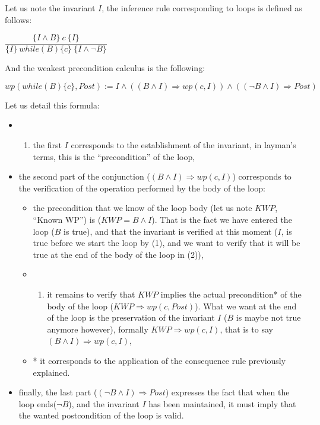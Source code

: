 
Let us note the invariant $I$, the inference rule corresponding to
loops is defined as follows:

\begin{center}
$\dfrac{\{I \wedge B \}\ c\ \{I\}}{\{I\}\ while(B)\{c\}\ \{I \wedge \neg B\}}$
\end{center}

And the weakest precondition calculus is the following:

\begin{center}
$wp(while (B) \{ c \}, Post) := I \wedge ((B \wedge I) \Rightarrow wp(c, I)) \wedge ((\neg B \wedge I) \Rightarrow Post)$
\end{center}

Let us detail this formula:

\begin{itemize}
\item
  \begin{enumerate}
  \def\labelenumi{(\arabic{enumi})}
  \item
    the first $I$ corresponds to the establishment of the invariant,
    in layman's terms, this is the ``precondition'' of the loop,
  \end{enumerate}
\item
  the second part of the conjunction
  ($(B \wedge I) \Rightarrow wp(c, I)$) corresponds to the
  verification of the operation performed by the body of the loop:

  \begin{itemize}
  \item
    the precondition that we know of the loop body (let us note $KWP$,
    ``Known WP'') is ($KWP = B \wedge I$). That is the fact we have
    entered the loop ($B$ is true), and that the invariant is verified
    at this moment ($I$, is true before we start the loop by (1), and
    we want to verify that it will be true at the end of the body of the
    loop in (2)),
  \item
    \begin{enumerate}
    \def\labelenumi{(\arabic{enumi})}
    \setcounter{enumi}{1}
    \item
      it remains to verify that $KWP$ implies the actual precondition*
      of the body of the loop ($KWP \Rightarrow wp(c, Post)$). What we
      want at the end of the loop is the preservation of the invariant
      $I$ ($B$ is maybe not true anymore however), formally
      $KWP \Rightarrow wp(c, I)$, that is to say
      $(B \wedge I) \Rightarrow wp(c, I)$,
    \end{enumerate}
  \item
    * it corresponds to the application of the consequence rule
    previously explained.
  \end{itemize}
\item
  finally, the last part ($(\neg B \wedge I) \Rightarrow Post$)
  expresses the fact that when the loop ends($\neg B$), and the
  invariant $I$ has been maintained, it must imply that the wanted
  postcondition of the loop is valid.
\end{itemize}

